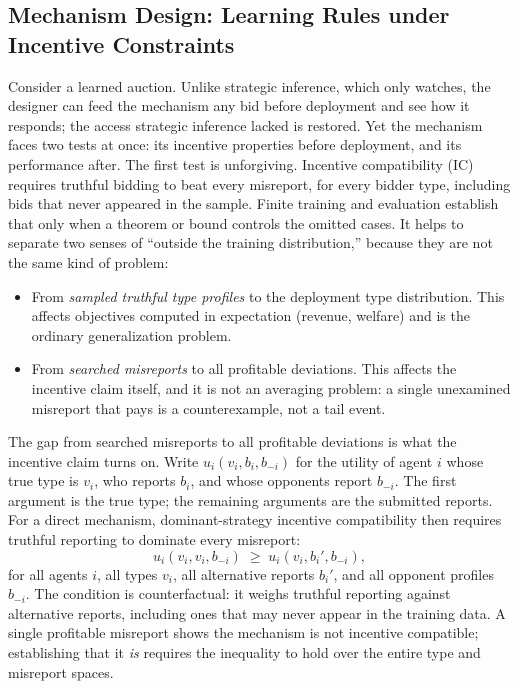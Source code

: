 \subsection{Mechanism Design: Learning Rules under Incentive Constraints}
\label{sec:ai4gt:mechanism}

Consider a learned auction. Unlike strategic inference, which only watches, the
designer can feed the mechanism any bid before deployment and see how it responds; the access strategic inference lacked is restored. Yet the mechanism faces two tests
at once: its incentive properties before deployment, and its performance after. The
first test is unforgiving. Incentive compatibility (IC) requires truthful bidding to
beat every misreport, for every bidder type, including bids that never appeared in the sample. Finite training and evaluation establish that only when a theorem or
bound controls the omitted cases. It helps to separate two senses of ``outside the training
distribution,'' because they are not the same kind of problem:

\begin{itemize}
\item From \emph{sampled truthful type profiles} to the deployment type
distribution. This affects objectives computed in expectation (revenue, welfare) and is the
ordinary generalization problem.
\item From \emph{searched misreports} to all profitable deviations. This affects
the incentive claim itself, and it is not an averaging problem: a single
unexamined misreport that pays is a counterexample, not a tail event.
\end{itemize}

The gap from searched misreports to all profitable deviations is what the incentive
claim turns on. Write
\(u_i(v_i, b_i, b_{-i})\) for the utility of agent \(i\) whose true type is
\(v_i\), who reports \(b_i\), and whose opponents report \(b_{-i}\). The first
argument is the true type; the remaining arguments are the submitted reports.
For a direct mechanism, dominant-strategy incentive compatibility then
requires truthful reporting to dominate every misreport:
\[
u_i(v_i,v_i,b_{-i})
\;\geq\;
u_i(v_i,b_i',b_{-i}),
\]
for all agents \(i\), all types \(v_i\), all alternative reports \(b_i'\), and
all opponent profiles \(b_{-i}\). The condition is counterfactual: it weighs truthful reporting against
alternative reports, including ones that may never
appear in the training data. A single profitable misreport shows the mechanism is
not incentive compatible; establishing that it \emph{is} requires the inequality
to hold over the entire type and misreport spaces.

